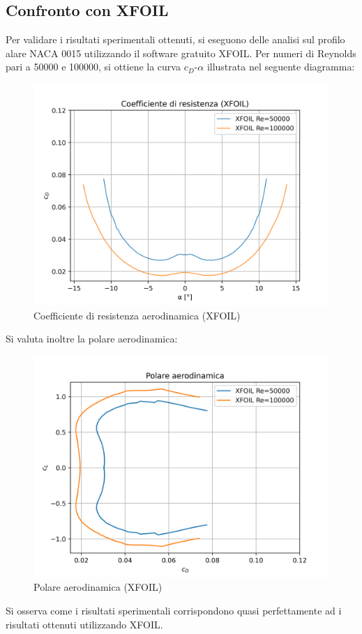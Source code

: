 \subsection{Confronto con XFOIL}
Per validare i risultati sperimentali ottenuti, si eseguono delle analisi sul profilo alare NACA 0015 utilizzando il software gratuito XFOIL. Per numeri di Reynolds pari a 50000 e 100000, si ottiene la curva $c_D$-$\alpha$ illustrata nel seguente diagramma:
\begin{figure}[H]
    \centering
    \includegraphics[width=.65\textwidth]{images/6/xfoil.png}
    \caption{Coefficiente di resistenza aerodinamica (XFOIL)}
\end{figure}
\noindent Si valuta inoltre la polare aerodinamica:
\begin{figure}[H]
    \centering
    \includegraphics[width=.65\textwidth]{images/6/clvcdxfoil.png}
    \caption{Polare aerodinamica (XFOIL)}
\end{figure}

\noindent Si osserva come i risultati sperimentali corrispondono quasi perfettamente ad i risultati ottenuti utilizzando XFOIL.

